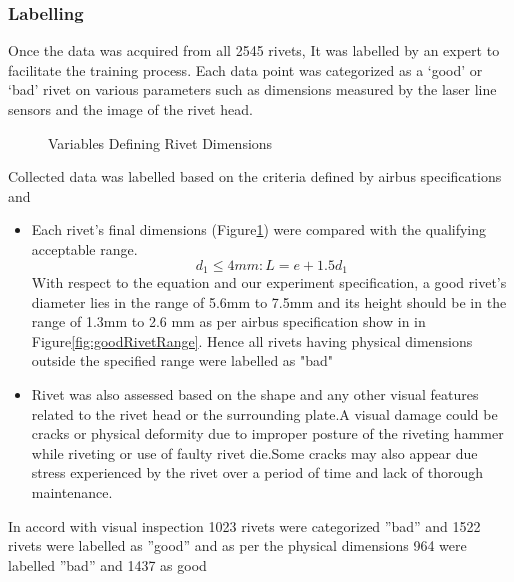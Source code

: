 \documentclass{article}
\begin{document}
\subsubsection{Labelling}

Once the data was acquired from all 2545 rivets, It was labelled by an expert to facilitate  the training process. Each data point was categorized as a ‘good’ or ‘bad’ rivet on various parameters such as dimensions measured by the laser line sensors and the image of the rivet head.

\begin{figure}[H]
  \centering
  \hfill
  \caption{Variables Defining Rivet Dimensions}
  \label{fig:RivetLabelVariable}
\end{figure}




Collected data was labelled based on the criteria defined by airbus specifications \cite{airbusRivetSpecification} and \cite{FAA_visual_Inspection}

\begin{itemize}
    \item  Each rivet's final dimensions (Figure\ref{fig:RivetLabelVariable}) were compared with the qualifying acceptable range.
\\ \[ d_1 \leq 4mm :  L = e + 1.5d_1 \]
With respect to the equation and our experiment specification, a good rivet's diameter lies in the range of 5.6mm to 7.5mm and its height should be in the range of 1.3mm to 2.6 mm as per airbus specification show in in Figure\ref{fig:goodRivetRange}. Hence all rivets having physical dimensions outside the specified range were labelled as "bad" 

\item Rivet was also assessed based on the shape and any other visual features related to the rivet head or the surrounding plate.A visual damage could be cracks or physical deformity due to improper posture of the riveting hammer while riveting or use of faulty rivet die.Some cracks may also appear due stress experienced by the rivet over a period of time and lack of thorough maintenance.
\end{itemize}

In  accord  with  visual  inspection  1023  rivets  were  categorized ”bad” and 1522 rivets were labelled as ”good” and as per the physical dimensions 964 were labelled ”bad” and 1437 as good
\end{document}
